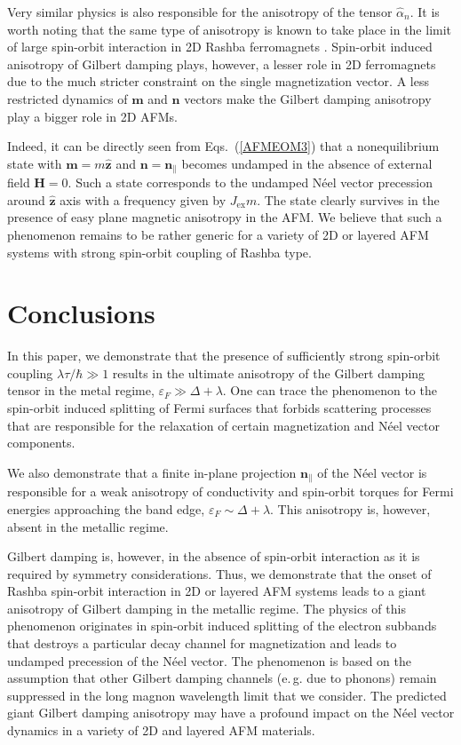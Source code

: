 \documentclass[%
  twocolumn,
  aps,
  prb,
  amsmath,
  amssymb,
  superscriptaddress,
  nofootinbib,
  floatfix
]{revtex4-1}
\newcommand{\ep}{\varepsilon}
\newcommand{\bb}{\boldsymbol}
\newcommand{\0}{^{\phantom{\dagger}}}
\begin{document}
Very similar physics is also responsible for the anisotropy of the tensor $\hat{\alpha}_n$. It is worth noting that the same type of anisotropy is known to take place in the limit of large spin-orbit interaction in 2D Rashba ferromagnets \cite{AdoSTTGD2019}. Spin-orbit induced anisotropy of Gilbert damping plays, however, a lesser role in 2D ferromagnets due to the much stricter constraint on the single magnetization vector.  A less restricted dynamics of $\bb{m}$ and $\bb{n}$ vectors make the Gilbert damping anisotropy play a bigger role in 2D AFMs. 

Indeed, it can be directly seen from Eqs.~(\ref{AFMEOM3}) that a nonequilibrium state with  $\bb{m}=m \hat{\bb{z}}$ and $\bb{n}=\bb{n}_\parallel$ becomes undamped in the absence of external field $\bb{H}=0$. Such a state corresponds to the undamped N\'eel vector precession around $\hat{\bb{z}}$ axis with a frequency given by $J_\textrm{ex} m$. The state clearly survives in the presence of easy plane magnetic anisotropy in the AFM. We believe that such a phenomenon remains to be rather generic for a variety of 2D or layered AFM systems with strong spin-orbit coupling of Rashba type. 

\section{Conclusions}

In this paper, we demonstrate that the presence of sufficiently strong spin-orbit coupling $\lambda\tau/\hbar \gg 1$ results in the ultimate anisotropy of the Gilbert damping tensor in the metal regime, $\ep_F\gg\Delta+\lambda$.  One can trace the phenomenon to the spin-orbit induced splitting of Fermi surfaces that forbids scattering processes that are responsible for the relaxation of certain magnetization and N\'eel vector components. 

We also demonstrate that a finite in-plane projection $\bb{n}_\parallel$ of the N\'eel vector is responsible for a weak anisotropy of conductivity and spin-orbit torques for Fermi energies approaching the band edge, $\ep_F \sim \Delta+\lambda$. This anisotropy is, however, absent in the metallic regime. 

Gilbert damping is, however, in the absence of spin-orbit interaction as it is required by symmetry considerations. Thus, we demonstrate that the onset of Rashba spin-orbit interaction in 2D or layered AFM systems leads to a giant anisotropy of Gilbert damping in the metallic regime. The physics of this phenomenon originates in spin-orbit induced splitting of the electron subbands that destroys a particular decay channel for magnetization and leads to undamped precession of the N\'eel vector. The phenomenon is based on the assumption that other Gilbert damping channels  (e.\,g. due to phonons) remain suppressed in the long magnon wavelength limit that we consider. The predicted giant Gilbert damping anisotropy  may have a profound impact on the N\'eel vector dynamics in a variety of 2D and layered AFM materials. 
\end{document}
